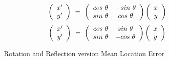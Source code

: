 \begin{equation}
  \centering
	\left( \begin{array}{c} x' \\ y' \end{array}\right)~=~\left( \begin{array}{ccc} 
	cos~\theta & -sin~\theta \\ 
	sin~\theta & cos~\theta \end{array}\right)
	\left( \begin{array}{c} x \\ y \end{array}\right)
	\label{eqn:rotmatrix} 
\end{equation}
\begin{equation}
  \centering
	\left( \begin{array}{c} x' \\ y' \end{array}\right)~=~\left( \begin{array}{ccc} 
	cos~\theta & sin~\theta \\ 
	sin~\theta & -cos~\theta \end{array}\right)
	\left( \begin{array}{c} x \\ y \end{array}\right)
	\label{eqn:refmatrix} 
\end{equation}

\begin{figure}
  \centering
	\label{fig:rotref}
	\caption{Rotation and Reflection version Mean Location Error}
\end{figure}
